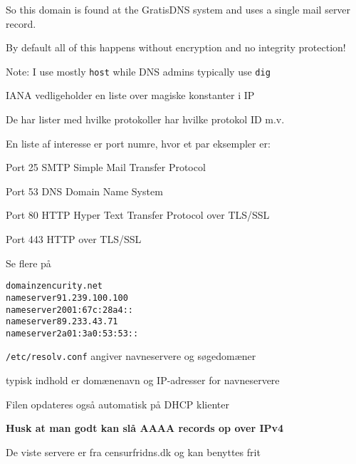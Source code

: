 \documentclass[Screen16to9,17pt]{foils}
\begin{document}
So this domain is found at the GratisDNS system and uses a single mail server record.

By default all of this happens without encryption and no integrity protection!

Note: I use mostly \verb+host+ while DNS admins typically use \verb+dig+



\begin{list1}
\item IANA vedligeholder en liste over magiske konstanter i IP
\item De har lister med hvilke protokoller har hvilke protokol ID m.v.
\item En liste af interesse er port numre, hvor et par eksempler er:
\begin{list2}
\item Port 25 SMTP Simple Mail Transfer Protocol
\item Port 53 DNS Domain Name System
\item Port 80 HTTP Hyper Text Transfer Protocol over TLS/SSL
\item Port 443 HTTP over TLS/SSL
\end{list2}
\item Se flere på 
\end{list1}



\begin{alltt}
domain zencurity.net
nameserver 91.239.100.100
nameserver 2001:67c:28a4::
nameserver 89.233.43.71
nameserver 2a01:3a0:53:53::
\end{alltt}

\begin{list1}
\item \verb+/etc/resolv.conf+ angiver navneservere og søgedomæner
\item typisk indhold er domænenavn og IP-adresser for navneservere
\item Filen opdateres også automatisk på DHCP klienter
\item {\bf Husk at man godt kan slå AAAA records op over IPv4}
\item De viste servere er fra censurfridns.dk og kan benyttes frit
\end{list1}


\end{document}
